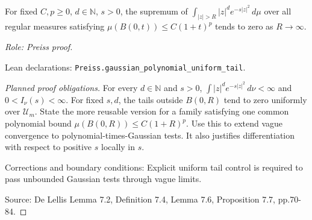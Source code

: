 \begin{lemma}
\label{lem:gaussian-uniform-tails}







For fixed $C,p\geq0$, $d\in\mathbb N$, $s>0$, the supremum of $\int_{|z|>R}|z|^d e^{-s|z|^2}\,d\mu$ over all regular measures satisfying $\mu(B(0,t))\leq C(1+t)^p$ tends to zero as $R\to\infty$.
\par\emph{Role: Preiss proof.}
\par Lean declarations: \texttt{Preiss.gaussian\_polynomial\_uniform\_tail}.
\end{lemma}
\begin{proof}[Planned proof obligations]

For every $d\in\mathbb N$ and $s>0$,
$\int |z|^d e^{-s|z|^2}\,d\nu<\infty$ and $0<I_\nu(s)<\infty$.
For fixed $s,d$, the tails outside $B(0,R)$ tend to zero uniformly over
$\mathcal U_m$. State the more reusable version for a family satisfying one
common polynomial bound $\mu(B(0,R))\leq C(1+R)^p$.
Use this to extend vague convergence to polynomial-times-Gaussian tests.
It also justifies differentiation with respect to positive $s$ locally in $s$.
\par Corrections and boundary conditions: Explicit uniform tail control is required to pass unbounded Gaussian tests through vague limits.
\par Source: De Lellis Lemma 7.2, Definition 7.4, Lemma 7.6, Proposition 7.7, pp.70-84.
\end{proof}

